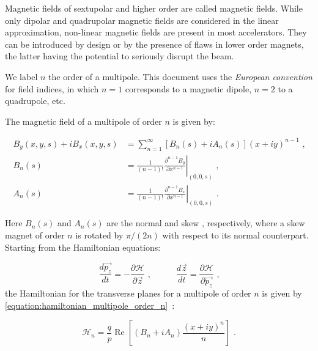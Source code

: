 Magnetic fields of sextupolar and higher order are called  magnetic fields.
While only dipolar and quadrupolar magnetic fields are considered in the linear approximation, non-linear magnetic fields are present in most accelerators.
They can be introduced by design or by the presence of flaws in lower order magnets, the latter having the potential to seriously disrupt the beam.

\begin{noteblock}
    We label \(n\) the order of a multipole.
    This document uses the \textit{European convention} for field indices, in which \(n = 1\) corresponds to a magnetic dipole, \(n = 2\) to a quadrupole, etc.
\end{noteblock}

The magnetic field of a multipole of order \(n\) is given by:

\begin{equation}
    \begin{aligned}
    B_y(x, y, s) + i B_x(x, y, s) & = \sum_{n=1}^{\infty} \left[ B_n(s) + i A_n(s) \right] (x + i y)^{n-1} \text{ ,} \\
    B_n(s)                        & = \left. \frac{1}{(n - 1) !} \frac{\partial^{n - 1} B_y}{\partial x^{n - 1}} \right|_{(0,0,s)} \text{ ,} \\
    A_n(s)                        & = \left. \frac{1}{(n - 1) !} \frac{\partial^{n - 1} B_x}{\partial x^{n - 1}} \right|_{(0,0,s)} \text{ .} 
    \end{aligned}
    \label{equation:multipole_expansion}
\end{equation}

Here \(B_n(s)\) and \(A_n(s)\) are the \gls{normal} and \gls{skew} , respectively, where a skew magnet of order \(n\) is rotated by \(\pi / (2 n)\) with respect to its normal counterpart.
Starting from the Hamiltonian equations:

\begin{equation}
    \dfrac{d \vec{p_z}}{d t} = - \frac{\partial \mathcal{H}}{\partial \vec{z}} \text{ ,} \quad \quad \quad \dfrac{d \vec{z}}{d t} = \frac{\partial \mathcal{H}}{\partial \vec{p_z}} \text{ ,}
    \label{equation:hamiltonian_equations}
\end{equation}
the Hamiltonian for the transverse planes for a multipole of order \(n\) is given by \cref{equation:hamiltonian_multipole_order_n}~\cite{PHD:Tomas, PHD:Franchi}:

\begin{equation}
    \mathcal{H}_n = \frac{q}{p} \operatorname{Re} \left[ \left( B_n +i A_n \right) \frac{(x + i y)^n}{n} \right] \text{ .}
    \label{equation:hamiltonian_multipole_order_n}
\end{equation}

